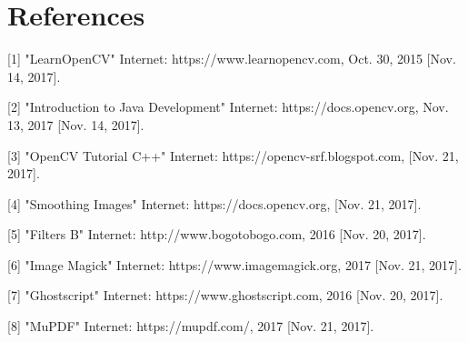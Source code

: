 \documentclass[onecolumn, draftclsnofoot,10pt, compsoc]{IEEEtran}
\begin{document}
\section{References}
[1] "LearnOpenCV" Internet: https://www.learnopencv.com, Oct. 30, 2015 [Nov. 14, 2017].

[2] "Introduction to Java Development" Internet: https://docs.opencv.org, Nov. 13, 2017 [Nov. 14, 2017].

[3] "OpenCV Tutorial C++" Internet: https://opencv-srf.blogspot.com, [Nov. 21, 2017].

[4] "Smoothing Images" Internet: https://docs.opencv.org, [Nov. 21, 2017].

[5] "Filters B" Internet: http://www.bogotobogo.com, 2016 [Nov. 20, 2017].

[6] "Image Magick" Internet: https://www.imagemagick.org, 2017 [Nov. 21, 2017].

[7] "Ghostscript" Internet: https://www.ghostscript.com, 2016 [Nov. 20, 2017]. 

[8] "MuPDF" Internet: https://mupdf.com/, 2017 [Nov. 21, 2017]. 
\end{document}
